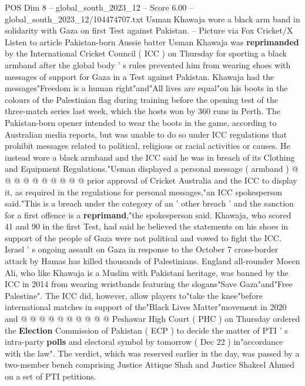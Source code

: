 \begin{textsample}{POS Dim 8 – global\_south\_2023\_12 – Score 6.00 – global\_south\_2023\_12/104474707.txt}  \label{ex:f8_pos_231}
Usman Khawaja wore a black arm band in solidarity with Gaza on first Test against Pakistan. -- Picture via Fox Cricket/X Listen to article Pakistan-born Aussie batter Usman Khawaja was \textbf{reprimanded} by the International Cricket Council ( ICC ) on Thursday for sporting a black armband after the global body ' s rules prevented him from wearing shoes with messages of support for Gaza in a Test against Pakistan.
Khawaja had the messages"Freedom is a human right"and"All lives are equal"on his boots in the colours of the Palestinian flag during training before the opening test of the three-match series last week, which the hosts won by 360 runs in Perth.
The Pakistan-born opener intended to wear the boots in the game, according to Australian media reports, but was unable to do so under ICC regulations that prohibit messages related to political, religious or racial activities or causes.
He instead wore a black armband and the ICC said he was in breach of its Clothing and Equipment Regulations."Usman displayed a personal message ( armband ) @ @ @ @ @ @ @ @ @ @ prior approval of Cricket Australia and the ICC to display it, as required in the regulations for personal messages,"an ICC spokesperson said."This is a breach under the category of an ' other breach ' and the sanction for a first offence is a \textbf{reprimand},"the spokesperson said.
Khawaja, who scored 41 and 90 in the first Test, had said he believed the statements on his shoes in support of the people of Gaza were not political and vowed to fight the ICC.
Israel ' s ongoing assault on Gaza in response to the October 7 cross-border attack by Hamas has killed thousands of Palestinians.
England all-rounder Moeen Ali, who like Khawaja is a Muslim with Pakistani heritage, was banned by the ICC in 2014 from wearing wristbands featuring the slogans"Save Gaza"and"Free Palestine".
The ICC did, however, allow players to"take the knee"before international matches in support of the"Black Lives Matter"movement in 2020 and @ @ @ @ @ @ @ @ @ @ Peshawar High Court ( PHC ) on Thursday ordered the \textbf{Election} Commission of Pakistan ( ECP ) to decide the matter of PTI ' s intra-party \textbf{polls} and electoral symbol by tomorrow ( Dec 22 ) in"accordance with the law".
The verdict, which was reserved earlier in the day, was passed by a two-member bench comprising Justice Attique Shah and Justice Shakeel Ahmed on a set of PTI petitions.

\end{textsample}
